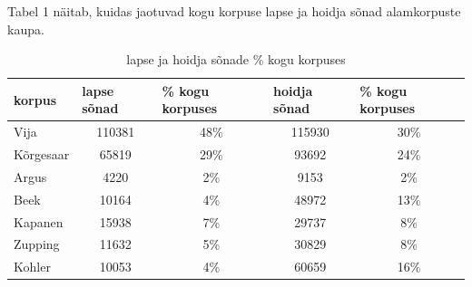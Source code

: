 \documentclass[12pt]{article}
\begin{document}
Tabel 1 näitab, kuidas jaotuvad kogu korpuse lapse ja hoidja sõnad alamkorpuste kaupa.

\begin{table}[H]
\centering
\caption{lapse ja hoidja sõnade \% kogu korpuses}
\begin{tabular}{|l|c|c|c|c|}
\hline
korpus                 & \multicolumn{1}{l|}{lapse sõnad}                                       & \multicolumn{1}{l|}{\% kogu korpuses} & \multicolumn{1}{l|}{hoidja sõnad}                                      & \multicolumn{1}{l|}{\% kogu korpuses} \\ \hline\hline
Vija                   & 110381                                                                 & 48\%                                   & 115930                                                                 & 30\%                                   \\ \hline
Kõrgesaar              & 65819                                                                  & 29\%                                   & 93692                                                                  & 24\%                                   \\ \hline
Argus                  & 4220                                                                   & 2\%                                    & 9153                                                                   & 2\%                                    \\ \hline
Beek                   & 10164                                                                  & 4\%                                    & 48972                                                                  & 13\%                                   \\ \hline
Kapanen                & 15938                                                                  & 7\%                                    & 29737                                                                  & 8\%                                    \\ \hline
Zupping                & 11632                                                                  & 5\%                                    & 30829                                                                  & 8\%                                    \\ \hline
Kohler                 & 10053                                                                  & 4\%                                    & 60659                                                                  & 16\%                                   \\ \hline\hline

\end{tabular}
\end{table}
\end{document}
